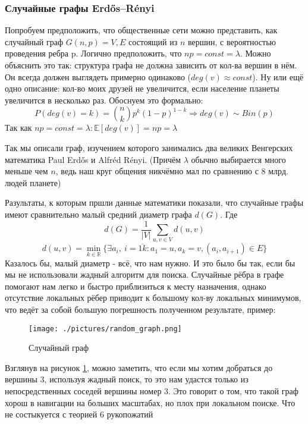 \subsubsection{Случайные графы Erdős–Rényi}
Попробуем предположить, что общественные сети можно
представить, как случайный граф $G(n, p) = {V, E}$ состоящий из $n$ вершин, с
вероятностью проведения ребра p. Логично предположить, что $np = const = \lambda$.
Можно объяснить это так: структура графа не должна зависить от кол-ва
вершин в нём. Он всегда должен выглядеть примерно одинаково ($deg(v) \approx const$). Ну или ещё
одно описание: кол-во моих друзей не увеличится, если население планеты 
увеличится в несколько раз. Обоснуем это формально:
\begin{equation}
    P(deg(v) = k) = \binom{n}{k}p^k(1-p)^{1-k}
    \Rightarrow deg(v) \sim Bin(p)
\end{equation}
Так как $np = const = \lambda : \mathbb{E}[deg(v)] = np = \lambda$

Так мы описали граф, изучением которого занимались
два великих Венгерских математика Paul Erdős и Alfréd Rényi. (Причём $\lambda$ обычно
выбирается много меньше чем $n$, ведь наш круг общения никчёмно мал по сравнению с 8 млрд. людей
планете) 

Разультаты, к которым пршли данные математики показали, что случайные графы имеют 
сравнительно малый средний диаметр графа $d(G)$. Где
\begin{equation}
    d(G) = \frac{1}{|V|}\sum_{u, v \in V}d(u, v)
\end{equation}
\begin{equation}
    d(u, v) = \min_{k \in \mathbb{R}}\{\exists a_i, \ i = \overline{1k}  : a_1 = u, a_k = v, (a_i, a_{i + 1}) \in E\}
\end{equation}
Казалось бы, малый диаметр - всё, что нам нужно. И это было бы так, если бы мы не 
использовали жадный алгоритм для поиска. Случайные рёбра в графе помогают 
нам легко и быстро приблизиться к месту назначения, однако отсутствие локальных
рёбер приводит к большому кол-ву локальных минимумов, что ведёт за собой большую
погрешность полученном результате, пример:

\begin{figure}[H]
\centering
\texttt{[image: ./pictures/random\_graph.png]}
\caption{Случайный граф} \label{random_graph}
\end{figure}

Взглянув на рисунок \ref{random_graph}, можно заметить, что если мы хотим добраться до вершины 3,
используя жадный поиск, то это нам удастся только из непосредственных соседей вершины номер 3.
Это говорит о том, что такой граф хорош в навигации на больших масштабах, но плох при локальном
поиске. Что не состыкуется с теорией 6 рукопожатий

